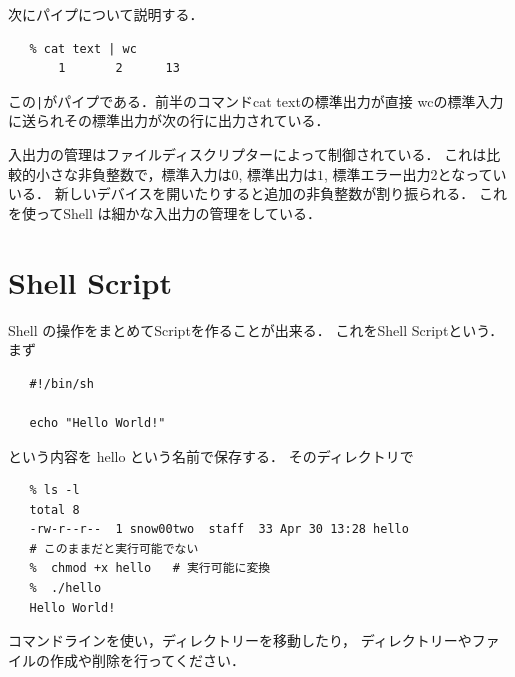 次にパイプについて説明する．
\begin{verbatim}
   % cat text | wc
       1       2      13
\end{verbatim}
この\verb/|/がパイプである．前半のコマンドcat textの標準出力が直接
wcの標準入力に送られその標準出力が次の行に出力されている．

入出力の管理はファイルディスクリプターによって制御されている．
これは比較的小さな非負整数で，標準入力は$0$,
標準出力は$1$, 標準エラー出力$2$となっていいる．
新しいデバイスを開いたりすると追加の非負整数が割り振られる．
これを使ってShell は細かな入出力の管理をしている．

%
%
% 
%
%
%
%
%


\section{Shell Script}
Shell の操作をまとめてScriptを作ることが出来る．
これをShell Scriptという．まず
\begin{verbatim}
   #!/bin/sh
   
   echo "Hello World!"
\end{verbatim}
という内容を hello という名前で保存する．
そのディレクトリで
\begin{verbatim}
   % ls -l
   total 8
   -rw-r--r--  1 snow00two  staff  33 Apr 30 13:28 hello
   # このままだと実行可能でない
   %  chmod +x hello   # 実行可能に変換
   %  ./hello
   Hello World!
\end{verbatim}

\begin{Q}
   コマンドラインを使い，ディレクトリーを移動したり，
   ディレクトリーやファイルの作成や削除を行ってください．
\end{Q}


